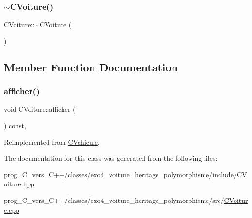 \subsubsection{\texorpdfstring{$\sim$\+C\+Voiture()}{~CVoiture()}}
{\footnotesize\ttfamily C\+Voiture\+::$\sim$\+C\+Voiture (\begin{DoxyParamCaption}{ }\end{DoxyParamCaption})\hspace{0.3cm}{\ttfamily [virtual]}}



\subsection{Member Function Documentation}
\mbox{\label{classCVoiture_a0dd704fa1e172f461950f7f21a7ce21e}} 
\subsubsection{\texorpdfstring{afficher()}{afficher()}}
{\footnotesize\ttfamily void C\+Voiture\+::afficher (\begin{DoxyParamCaption}{ }\end{DoxyParamCaption}) const\hspace{0.3cm}{\ttfamily [override]}, {\ttfamily [virtual]}}



Reimplemented from \hyperlink{classCVehicule_a7d62fa555949feb096b4f56781164895}{C\+Vehicule}.



The documentation for this class was generated from the following files\+:\begin{DoxyCompactItemize}
\item 
prog\+\_\+\+C\+\_\+vers\+\_\+\+C++/classes/exo4\+\_\+voiture\+\_\+heritage\+\_\+polymorphisme/include/\hyperlink{CVoiture_8hpp}{C\+Voiture.\+hpp}\item 
prog\+\_\+\+C\+\_\+vers\+\_\+\+C++/classes/exo4\+\_\+voiture\+\_\+heritage\+\_\+polymorphisme/src/\hyperlink{CVoiture_8cpp}{C\+Voiture.\+cpp}\end{DoxyCompactItemize}
